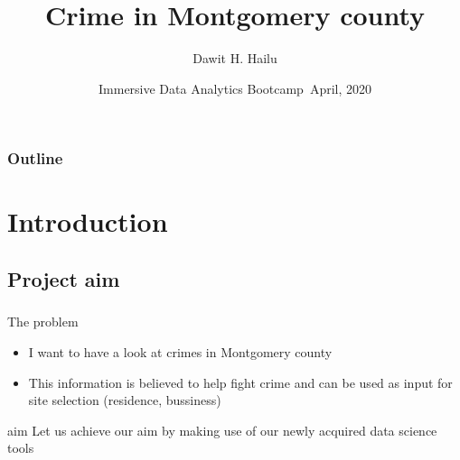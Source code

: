 \documentclass[usenames,dvipsnames]{beamer}
\title[Data Science]{Crime in Montgomery county} %
\author{Dawit H. Hailu} %
\institute[Montgomery  College ] %
{

    \graphicspath{{Figures//}}
     \texttt{[image: MClogo.eps]}\\ 
    
\medskip
\textit{dhailu@montgomerycollege.edu} \\%

}
\date{Immersive Data Analytics Bootcamp\ April, 2020} %
\begin{document}
\begin{frame}[noframenumbering]
\titlepage %
\thispagestyle{empty}
\end{frame}
\begin{frame}[noframenumbering]
\frametitle{Outline} %
\small
\tableofcontents %
\thispagestyle{empty}
\end{frame}
\section{Introduction}
\subsection{Project aim}
\begin{frame}
\frametitle{}
\begin{block}{The problem}
\begin{itemize}
 \item I want to have a look at crimes in Montgomery county 
 \item This information is believed to help  fight crime and can be used as input for site selection (residence, bussiness)
 \end{itemize}
\end{block}
\begin{block}{aim}
Let us achieve our aim by making use of our newly acquired data science tools
\end{block}
\end{frame}
\end{document}
